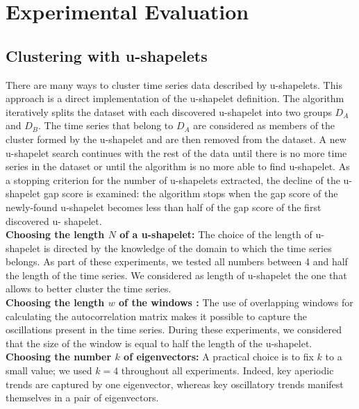 \section[Experiments]{Experimental Evaluation}

\subsection{Clustering with u-shapelets}
There are many ways to cluster time series data described by u-shapelets. This approach is a direct implementation of the u-shapelet definition. The algorithm iteratively splits the dataset with each discovered u-shapelet into two groups $D_A$ and $D_B$. The time series that belong to $D_A$ are considered as members of the cluster formed by the u-shapelet and are then removed from the dataset. A new u-shapelet search continues with the rest of the data until there is no more time series in the dataset or until the algorithm is no more able to find u-shapelet. As a stopping criterion for the number of u-shapelets extracted, the decline of the u-shapelet gap score is examined: the algorithm stops when the gap score of the newly-found u-shapelet becomes less than half of the gap score of the first discovered u- shapelet. 
\\
\textbf{Choosing the length $N$ of a u-shapelet: }
The choice of the length of u-shapelet is directed by the knowledge of the
domain to which the time series belongs. As part of these experiments, we tested all  numbers between 4 and half the length of the time series. We considered as length of u-shapelet the one that allows to better cluster the time series.
\\
\textbf{Choosing the length $w$ of the windows : }
The use of overlapping windows for calculating the autocorrelation matrix makes
it possible to capture the oscillations present in the time series. During these experiments, we considered that the size of the window is equal to half the length of the u-shapelet.
\\
\textbf{Choosing  the number $k$ of eigenvectors: }
A practical choice is to fix $k$ to a small value; we used $k = 4$ throughout all
experiments. Indeed, key aperiodic trends are captured by one eigenvector,
whereas key oscillatory trends manifest themselves in a pair of eigenvectors.  

